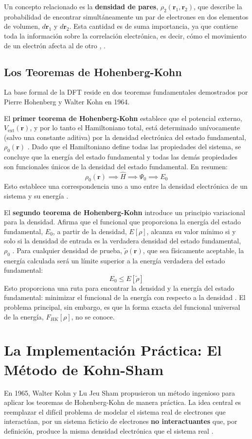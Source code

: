 Un concepto relacionado es la \textbf{densidad de pares}, $\rho_2(\mathbf{r}_1, \mathbf{r}_2)$, que describe la probabilidad de encontrar simultáneamente un par de electrones en dos elementos de volumen, $d\mathbf{r}_1$ y $d\mathbf{r}_2$. Esta cantidad es de suma importancia, ya que contiene toda la información sobre la correlación electrónica, es decir, cómo el movimiento de un electrón afecta al de otro \cite[188]{ramachandran2008computational}, \cite[38]{koch2015chemist}.

\subsection{Los Teoremas de Hohenberg-Kohn}
La base formal de la DFT reside en dos teoremas fundamentales demostrados por Pierre Hohenberg y Walter Kohn en 1964.

El \textbf{primer teorema de Hohenberg-Kohn} establece que el potencial externo, $V_{\text{ext}}(\mathbf{r})$, y por lo tanto el Hamiltoniano total, está determinado unívocamente (salvo una constante aditiva) por la densidad electrónica del estado fundamental, $\rho_0(\mathbf{r})$ \cite[50]{koch2015chemist}. Dado que el Hamiltoniano define todas las propiedades del sistema, se concluye que la energía del estado fundamental y todas las demás propiedades son funcionales únicos de la densidad del estado fundamental. En resumen:
$$ \rho_0(\mathbf{r}) \implies \hat{H} \implies \Psi_0 \implies E_0 $$
Esto establece una correspondencia uno a uno entre la densidad electrónica de un sistema y su energía \cite[253]{jensen2017introduction}.

El \textbf{segundo teorema de Hohenberg-Kohn} introduce un principio variacional para la densidad. Afirma que el funcional que proporciona la energía del estado fundamental, $E_0$, a partir de la densidad, $E[\rho]$, alcanza su valor mínimo si y solo si la densidad de entrada es la verdadera densidad del estado fundamental, $\rho_0$ \cite[53]{koch2015chemist}. Para cualquier densidad de prueba, $\tilde{\rho}(\mathbf{r})$, que sea físicamente aceptable, la energía calculada será un límite superior a la energía verdadera del estado fundamental:
$$ E_0 \le E[\tilde{\rho}] $$
Esto proporciona una ruta para encontrar la densidad y la energía del estado fundamental: minimizar el funcional de la energía con respecto a la densidad \cite[53]{koch2015chemist}. El problema principal, sin embargo, es que la forma exacta del funcional universal de la energía, $F_{HK}[\rho]$, no se conoce.

\section{La Implementación Práctica: El Método de Kohn-Sham}
En 1965, Walter Kohn y Lu Jeu Sham propusieron un método ingenioso para aplicar los teoremas de Hohenberg-Kohn de manera práctica. La idea central es reemplazar el difícil problema de modelar el sistema real de electrones que interactúan, por un sistema ficticio de electrones \textbf{no interactuantes} que, por definición, produce la misma densidad electrónica que el sistema real \cite[58]{koch2015chemist}.

